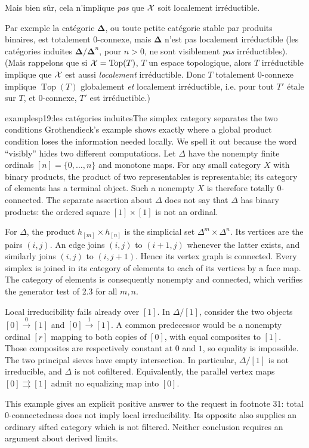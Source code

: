 Mais bien sûr, cela n'implique \textit{pas} que $\mathcal{X}$ soit localement irréductible.


\noindent Par exemple la catégorie $\boldsymbol{\Delta}$, ou toute petite catégorie stable par produits binaires, est totalement 0-connexe, mais $\boldsymbol{\Delta}$ n'est pas localement irréductible (les catégories induites $\boldsymbol{\Delta}/\boldsymbol{\Delta}^n$, pour $n > 0$, ne sont visiblement \textit{pas} irréductibles). (Mais rappelons que si $\mathcal{X} = \operatorname{Top}(T)$, $T$ un espace topologique, alors $T$ irréductible implique que $\mathcal{X}$ est aussi \textit{localement} irréductible. Donc $T$ totalement 0-connexe implique $\operatorname{Top}(T)$ globalement \textit{et} localement irréductible, i.e. pour tout $T'$ étale sur $T$, et 0-connexe, $T'$ est irréductible.)

\begin{dcomment}{examples}{p19:les catégories induites}{The simplex category separates the two conditions}
Grothendieck's example shows exactly where a global product condition loses the information needed locally. We spell it out because the word ``visibly'' hides two different computations. Let $\Delta$ have the nonempty finite ordinals $[n]=\{0,\ldots,n\}$ and monotone maps. For any small category $X$ with binary products, the product of two representables is representable; its category of elements has a terminal object. Such a nonempty $X$ is therefore totally $0$-connected. The separate assertion about $\Delta$ does not say that $\Delta$ has binary products: the ordered square $[1]\times[1]$ is not an ordinal.

For $\Delta$, the product $h_{[m]}\times h_{[n]}$ is the simplicial set $\Delta^m\times\Delta^n$. Its vertices are the pairs $(i,j)$. An edge joins $(i,j)$ to $(i+1,j)$ whenever the latter exists, and similarly joins $(i,j)$ to $(i,j+1)$. Hence its vertex graph is connected. Every simplex is joined in its category of elements to each of its vertices by a face map. The category of elements is consequently nonempty and connected, which verifies the generator test of 2.3 for all $m,n$.

Local irreducibility fails already over $[1]$. In $\Delta/[1]$, consider the two objects $[0]\xrightarrow{0}[1]$ and $[0]\xrightarrow{1}[1]$. A common predecessor would be a nonempty ordinal $[r]$ mapping to both copies of $[0]$, with equal composites to $[1]$. Those composites are respectively constant at $0$ and $1$, so equality is impossible. The two principal sieves have empty intersection. In particular, $\Delta/[1]$ is not irreducible, and $\Delta$ is not cofiltered. Equivalently, the parallel vertex maps $[0]\rightrightarrows[1]$ admit no equalizing map into $[0]$.

This example gives an explicit positive answer to the request in footnote 31: total $0$-connectedness does not imply local irreducibility. Its opposite also supplies an ordinary sifted category which is not filtered. Neither conclusion requires an argument about derived limits.
\end{dcomment}


